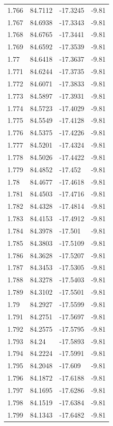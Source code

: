 \begin{tabular}{llll}
1.766 & 84.7112 & -17.3245 & -9.81 \\
1.767 & 84.6938 & -17.3343 & -9.81 \\
1.768 & 84.6765 & -17.3441 & -9.81 \\
1.769 & 84.6592 & -17.3539 & -9.81 \\
1.77 & 84.6418 & -17.3637 & -9.81 \\
1.771 & 84.6244 & -17.3735 & -9.81 \\
1.772 & 84.6071 & -17.3833 & -9.81 \\
1.773 & 84.5897 & -17.3931 & -9.81 \\
1.774 & 84.5723 & -17.4029 & -9.81 \\
1.775 & 84.5549 & -17.4128 & -9.81 \\
1.776 & 84.5375 & -17.4226 & -9.81 \\
1.777 & 84.5201 & -17.4324 & -9.81 \\
1.778 & 84.5026 & -17.4422 & -9.81 \\
1.779 & 84.4852 & -17.452 & -9.81 \\
1.78 & 84.4677 & -17.4618 & -9.81 \\
1.781 & 84.4503 & -17.4716 & -9.81 \\
1.782 & 84.4328 & -17.4814 & -9.81 \\
1.783 & 84.4153 & -17.4912 & -9.81 \\
1.784 & 84.3978 & -17.501 & -9.81 \\
1.785 & 84.3803 & -17.5109 & -9.81 \\
1.786 & 84.3628 & -17.5207 & -9.81 \\
1.787 & 84.3453 & -17.5305 & -9.81 \\
1.788 & 84.3278 & -17.5403 & -9.81 \\
1.789 & 84.3102 & -17.5501 & -9.81 \\
1.79 & 84.2927 & -17.5599 & -9.81 \\
1.791 & 84.2751 & -17.5697 & -9.81 \\
1.792 & 84.2575 & -17.5795 & -9.81 \\
1.793 & 84.24 & -17.5893 & -9.81 \\
1.794 & 84.2224 & -17.5991 & -9.81 \\
1.795 & 84.2048 & -17.609 & -9.81 \\
1.796 & 84.1872 & -17.6188 & -9.81 \\
1.797 & 84.1695 & -17.6286 & -9.81 \\
1.798 & 84.1519 & -17.6384 & -9.81 \\
1.799 & 84.1343 & -17.6482 & -9.81 \\

\end{tabular}

